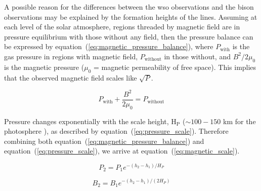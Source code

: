 A possible reason for the differences between the \gls{wso} observations and the \gls{bison} observations may be explained by the formation heights of the lines. Assuming at each level of the solar atmosphere, regions threaded by magnetic field are in pressure equilibrium with those without any field, then the pressure balance can be expressed by equation~(\ref{eq:magnetic_pressure_balance}), where $P_\mathrm{with}$ is the gas pressure in regions with magnetic field, $P_\mathrm{without}$ in those without, and $B^2/2\mu_0$ is the magnetic pressure ($\mu_0$ = magnetic permeability of free space). This implies that the observed magnetic field scales like $\sqrt{P}$.

\begin{equation}
P_\mathrm{with} + \frac{B^2}{2\mu_0} = P_\mathrm{without}
\label{eq:magnetic_pressure_balance}
\end{equation}

Pressure changes exponentially with the scale height, H$_\mathrm{P}$ ($\sim 100-150$ km for the photosphere \citep{christensen-dalsgaard_current_1996}), as described by equation~(\ref{eq:pressure_scale}). Therefore combining both equation~(\ref{eq:magnetic_pressure_balance}) and equation~(\ref{eq:pressure_scale}), we arrive at equation~(\ref{eq:magnetic_scale}).

\begin{equation}
P_2 = P_1 e^{ - (h_2-h_1)/H_P}
\label{eq:pressure_scale}
\end{equation}

\begin{equation}
B_2 = B_1 e^{ - (h_2-h_1)/(2H_P)}
\label{eq:magnetic_scale}
\end{equation} 



